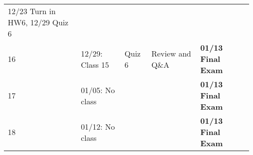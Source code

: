 \documentclass[
]{book}
\begin{document}
\begin{longtable}[]{@{}lllll@{}}
\begin{minipage}[t]{0.22\columnwidth}
12/23 Turn in HW6, 12/29 Quiz 6\strut
\end{minipage}\tabularnewline
\begin{minipage}[t]{0.08\columnwidth}\raggedright
16\strut
\end{minipage} & \begin{minipage}[t]{0.17\columnwidth}\raggedright
12/29: Class 15\strut
\end{minipage} & \begin{minipage}[t]{0.08\columnwidth}\raggedright
Quiz 6\strut
\end{minipage} & \begin{minipage}[t]{0.32\columnwidth}\raggedright
Review and Q\&A\strut
\end{minipage} & \begin{minipage}[t]{0.22\columnwidth}\raggedright
\textbf{01/13 Final Exam}\strut
\end{minipage}\tabularnewline
\begin{minipage}[t]{0.08\columnwidth}\raggedright
17\strut
\end{minipage} & \begin{minipage}[t]{0.17\columnwidth}\raggedright
01/05: No class\strut
\end{minipage} & \begin{minipage}[t]{0.08\columnwidth}\raggedright
\strut
\end{minipage} & \begin{minipage}[t]{0.32\columnwidth}\raggedright
\strut
\end{minipage} & \begin{minipage}[t]{0.22\columnwidth}\raggedright
\textbf{01/13 Final Exam}\strut
\end{minipage}\tabularnewline
\begin{minipage}[t]{0.08\columnwidth}\raggedright
18\strut
\end{minipage} & \begin{minipage}[t]{0.17\columnwidth}\raggedright
01/12: No class\strut
\end{minipage} & \begin{minipage}[t]{0.08\columnwidth}\raggedright
\strut
\end{minipage} & \begin{minipage}[t]{0.32\columnwidth}\raggedright
\strut
\end{minipage} & \begin{minipage}[t]{0.22\columnwidth}\raggedright
\textbf{01/13 Final Exam}\strut
\end{minipage}\tabularnewline
\bottomrule
\end{longtable}
\end{document}
